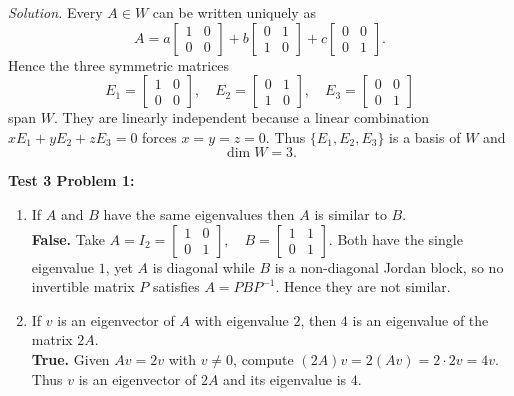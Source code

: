 \documentclass{article}
\begin{document}
\begin{multicols*}{2}
\begin{enumerate}[label=(\alph*)]
\textit{Solution.}  
Every $A\in W$ can be written uniquely as
$$
A = a\begin{bmatrix}1&0\\0&0\end{bmatrix}
  + b\begin{bmatrix}0&1\\1&0\end{bmatrix}
  + c\begin{bmatrix}0&0\\0&1\end{bmatrix}.
$$
Hence the three symmetric matrices
$$
E_1=\begin{bmatrix}1&0\\0&0\end{bmatrix},\quad
E_2=\begin{bmatrix}0&1\\1&0\end{bmatrix},\quad
E_3=\begin{bmatrix}0&0\\0&1\end{bmatrix}
$$
span $W$. They are linearly independent because a linear combination $xE_1+yE_2+zE_3=0$ forces $x=y=z=0$.  
Thus $\{E_1,E_2,E_3\}$ is a basis of $W$ and
$$
\dim W = 3.
$$

\end{enumerate}
\textbf{Test 3 Problem 1:}
\begin{enumerate}[label=(\alph*)]

    \item If $A$ and $B$ have the same eigenvalues then $A$ is similar to $B$.\\[2pt]
    \textbf{False.}\;  
    Take
    $
    A = I_2
    =
    \begin{bmatrix}
    1 & 0\\
    0 & 1
    \end{bmatrix},
    \quad
    B =
    \begin{bmatrix}
    1 & 1\\
    0 & 1
    \end{bmatrix}
    $.
    Both have the single eigenvalue $1$, yet $A$ is diagonal while $B$ is a non-diagonal Jordan block, so no invertible matrix $P$ satisfies $A = PBP^{-1}$. Hence they are not similar.
    
    \item If $v$ is an eigenvector of $A$ with eigenvalue $2$, then $4$ is an eigenvalue of the matrix $2A$.\\[2pt]
    \textbf{True.}\;  
    Given $Av = 2v$ with $v \ne 0$, compute
    $
    (2A)v = 2(Av) = 2\cdot 2v = 4v
    $.
    Thus $v$ is an eigenvector of $2A$ and its eigenvalue is $4$.
    

\end{enumerate}
\end{multicols*}
\end{document}
